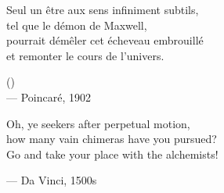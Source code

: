 \begin{flushright}
\itshape
\begin{hangleftquote}{\QFROpen}{\QFRClose}
Seul un être aux sens infiniment subtils,\\
tel que le démon de Maxwell,\\
pourrait démêler cet écheveau embrouillé\\
et remonter le cours de l'univers.
\end{hangleftquote}
\par\smallskip
\normalfont () \\
 — Poincaré, 1902
\end{flushright}
\vspace{2em}
\begin{flushright}
\begin{hangleftquote}{\QENOpen}{\QENClose}
Oh, ye seekers after perpetual motion,\\
how many vain chimeras have you pursued?\\
Go and take your place with the alchemists!
\end{hangleftquote}
\par\smallskip
\normalfont — Da Vinci, 1500s
\end{flushright}
